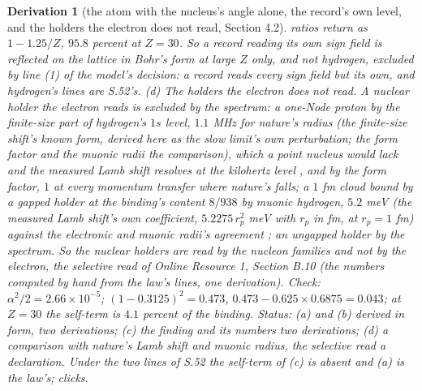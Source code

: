 \documentclass[pdflatex,sn-mathphys-num]{sn-jnl}
\theoremstyle{thmstyleone}
\newtheorem{derivation}{Derivation}
\begin{document}
\begin{derivation}[the atom with the nucleus's angle alone, the record's own level, and the holders the electron does not read, Section 4.2]
ratios return as $1 - 1.25 / Z$, $95.8$ percent at $Z = 30$. So a record reading its own sign field is reflected on the lattice in Bohr's form at large $Z$ only, and not hydrogen, excluded by line (1) of the model's decision: a record reads every sign field but its own, and hydrogen's lines are S.52's. (d) \emph{The holders the electron does not read.} A nuclear holder the electron reads is excluded by the spectrum: a one-Node proton by the finite-size part of hydrogen's $1s$ level, $1.1$ MHz for nature's radius (the finite-size shift's known form, derived here as the slow limit's own perturbation; the form factor and the muonic radii the comparison), which a point nucleus would lack and the measured Lamb shift resolves at the kilohertz level \cite{bezginov}, and by the form factor, $1$ at every momentum transfer where nature's falls; a $1$ fm cloud bound by a gapped holder at the binding's content $8 / 938$ by muonic hydrogen, $5.2$ meV (the measured Lamb shift's own coefficient, $5.2275\,r_p^2$ meV \cite{antognini} with $r_p$ in fm, at $r_p = 1$ fm) against the electronic and muonic radii's agreement \cite{antognini}; an ungapped holder by the spectrum. So the nuclear holders are read by the nucleon families and not by the electron, the selective read of Online Resource 1, Section B.10 (the numbers computed by hand from the law's lines, one derivation). \emph{Check:} $\alpha^2 / 2 = 2.66 \times 10^{-5}$; $(1 - 0.3125)^2 = 0.473$, $0.473 - 0.625 \times 0.6875 = 0.043$; at $Z = 30$ the self-term is $4.1$ percent of the binding. \emph{Status:} (a) and (b) derived in form, two derivations; (c) the finding and its numbers two derivations; (d) a comparison with nature's Lamb shift and muonic radius, the selective read a declaration. Under the two lines of S.52 the self-term of (c) is absent and (a) is the law's; clicks.
\end{derivation}
\end{document}
